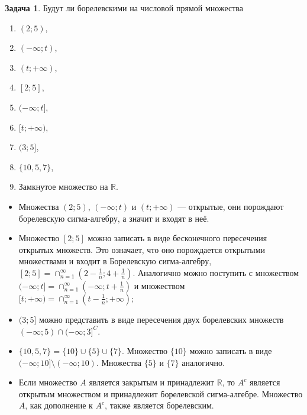 \documentclass[pdftex, 12pt, a4paper]{article}
\def \mbb{\mathbb}
\def \RR{\mbb R}
\theoremstyle{definition} %
\newtheorem{problem}{Задача}
\numberwithin{problem}{section}
\numberwithin{blits}{section}
\begin{document}
\begin{problem}\label{Bor}
Будут ли борелевскими на числовой прямой множества
\begin{multicols}{2}
\begin{enumerate}
    \item $(2;5)$,
    \item $(-\infty;t)$,
    \item $(t; +\infty)$,
    \item $[2;5]$,     
    \item $(-\infty;t]$,
    \item $[t; +\infty)$,
    \item $(3;5]$,   
    \item $\{10,5,7\}$,
    \item Замкнутое множество на $\RR$.
    
\end{enumerate}
\end{multicols}
\begin{sol}

\begin{itemize}

\item Множества $(2;5)$, $(-\infty;t)$ и $(t; +\infty)$ --- открытые, они порождают борелевскую сигма-алгебру, а значит и входят в неё. 

\item Множество $[2;5]$ можно записать в виде бесконечного пересечения открытых множеств. Это означает, что оно порождается открытыми множествами и входит в Борелевскую сигма-алгебру, $[2;5] = \cap_{n=1}^{\infty} (2- \frac{1}{n};4+\frac{1}{n})$. Аналогично можно поступить с множеством $(-\infty; t] = \cap_{n=1}^{\infty} (-\infty; t+\frac{1}{n})$ и множеством  $[t; +\infty) = \cap_{n=1}^{\infty} (t-\frac{1}{n};+\infty);$

\item $(3;5]$ можно представить в виде пересечения двух борелевских множеств $(-\infty;5) \cap (-\infty;3]^{C} $.

\item $\{10,5,7\} = \{10\} \cup \{5\} \cup \{7\}$. Множество $\{10\}$ можно записать в виде $(-\infty;10] \setminus (-\infty;10)$. Множества $\{5\}$ и $\{7\}$ аналогично. 

\item Если множество $A$ является закрытым и принадлежит $\RR$, то $A^c$ является открытым множеством и принадлежит борелевской сигма-алгебре. Множество $A$, как дополнение к $A^c$, также является борелевским.
\end{itemize}
\end{sol}
\end{problem}
\end{document}

